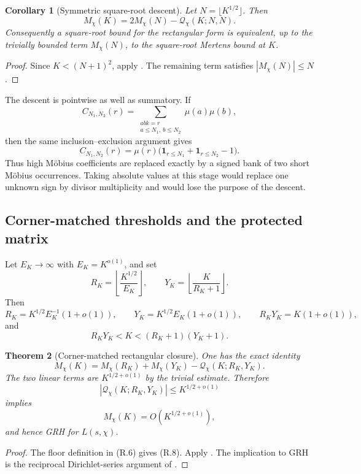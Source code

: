 \documentclass[11pt]{article}
\newtheorem{theorem}{Theorem}[section]
\newtheorem{corollary}[theorem]{Corollary}
\theoremstyle{definition}
\theoremstyle{remark}
\newcommand{\one}{\mathbf 1}
\newcommand{\abs}[1]{\left\lvert#1\right\rvert}
\begin{document}
\begin{corollary}[Symmetric square-root descent]
\label{cor:rectangular-symmetric}
Let $N=\lfloor K^{1/2}\rfloor$.  Then
\[
 \boxed{M_\chi(K)=2M_\chi(N)-\mathcal Q_\chi(K;N,N).}
 \tag{R.4}
\]
Consequently a square-root bound for the rectangular form is equivalent, up
to the trivially bounded term $M_\chi(N)$, to the square-root Mertens bound at
$K$.
\end{corollary}

\begin{proof}
Since $K<(N+1)^2$, apply .  The remaining
term satisfies $|M_\chi(N)|\le N$.
\end{proof}

The descent is pointwise as well as summatory.  If
\[
 C_{N_1,N_2}(r)
 =\sum_{\substack{abk=r\\a\le N_1,\ b\le N_2}}\mu(a)\mu(b),
\]
then the same inclusion--exclusion argument gives
\[
 \boxed{
 C_{N_1,N_2}(r)
 =\mu(r)\bigl(
   \one_{r\le N_1}+\one_{r\le N_2}-1
  \bigr).}
 \tag{R.5}
\]
Thus high M\"obius coefficients are replaced exactly by a signed bank of two
short M\"obius occurrences.  Taking absolute values at this stage would
replace one unknown sign by divisor multiplicity and would lose the purpose
of the descent.

\subsection{Corner-matched thresholds and the protected matrix}

Let $E_K\to\infty$ with $E_K=K^{o(1)}$, and set
\[
 R_K=\left\lfloor\frac{K^{1/2}}{E_K}\right\rfloor,
 \qquad
 Y_K=\left\lfloor\frac{K}{R_K+1}\right\rfloor.
 \tag{R.6}
\]
Then
\[
 R_K=K^{1/2}E_K^{-1}(1+o(1)),
 \qquad
 Y_K=K^{1/2}E_K(1+o(1)),
 \qquad
 R_KY_K=K(1+o(1)),
 \tag{R.7}
\]
and
\[
 R_KY_K<K<(R_K+1)(Y_K+1).
 \tag{R.8}
\]

\begin{theorem}[Corner-matched rectangular closure]
\label{thm:rectangular-corner}
One has the exact identity
\[
 \boxed{
 M_\chi(K)=M_\chi(R_K)+M_\chi(Y_K)
 -\mathcal Q_\chi(K;R_K,Y_K).}
 \tag{R.9}
\]
The two linear terms are $K^{1/2+o(1)}$ by the trivial estimate.  Therefore
\[
 \abs{\mathcal Q_\chi(K;R_K,Y_K)}\le K^{1/2+o(1)}
 \tag{R.10}
\]
implies
\[
 M_\chi(K)=O(K^{1/2+o(1)}),
\]
and hence GRH for $L(s,\chi)$.
\end{theorem}

\begin{proof}
The floor definition in \textup{(R.6)} gives \textup{(R.8)}.  Apply
.  The implication to GRH is the reciprocal
Dirichlet-series argument of .
\end{proof}
\end{document}
